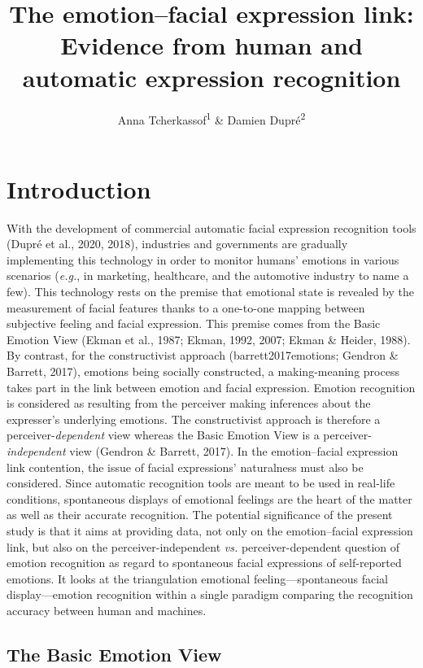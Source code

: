\documentclass[
  english,
  man]{apa7}
\title{The emotion--facial expression link: Evidence from human and automatic expression recognition}
\author{Anna Tcherkassof\textsuperscript{1} \& Damien Dupré\textsuperscript{2}}
\date{}
\affiliation{\vspace{0.5cm}\textsuperscript{1} University Grenoble Alpes, Grenoble, France\\\textsuperscript{2} Dublin City University, Dublin, Ireland}
\begin{document}
\maketitle







\hypertarget{introduction}{%
\section{Introduction}\label{introduction}}

With the development of commercial automatic facial expression recognition tools (Dupré et al., 2020, 2018), industries and governments are gradually implementing this technology in order to monitor humans' emotions in various scenarios (\emph{e.g.}, in marketing, healthcare, and the automotive industry to name a few). This technology rests on the premise that emotional state is revealed by the measurement of facial features thanks to a one-to-one mapping between subjective feeling and facial expression. This premise comes from the Basic Emotion View (Ekman et al., 1987; Ekman, 1992, 2007; Ekman \& Heider, 1988). By contrast, for the constructivist approach (barrett2017emotions; Gendron \& Barrett, 2017), emotions being socially constructed, a making-meaning process takes part in the link between emotion and facial expression. Emotion recognition is considered as resulting from the perceiver making inferences about the expresser's underlying emotions. The constructivist approach is therefore a perceiver-\emph{dependent} view whereas the Basic Emotion View is a perceiver-\emph{independent} view (Gendron \& Barrett, 2017). In the emotion--facial expression link contention, the issue of facial expressions' naturalness must also be considered. Since automatic recognition tools are meant to be used in real-life conditions, spontaneous displays of emotional feelings are the heart of the matter as well as their accurate recognition. The potential significance of the present study is that it aims at providing data, not only on the emotion--facial expression link, but also on the perceiver-independent \emph{vs.} perceiver-dependent question of emotion recognition as regard to spontaneous facial expressions of self-reported emotions. It looks at the triangulation emotional feeling---spontaneous facial display---emotion recognition within a single paradigm comparing the recognition accuracy between human and machines.

\hypertarget{the-basic-emotion-view}{%
\subsection{The Basic Emotion View}\label{the-basic-emotion-view}}
\end{document}

